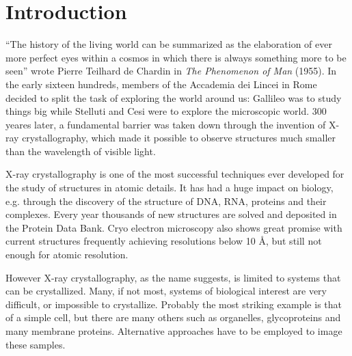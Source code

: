 \chapter{Introduction}\label{introduction}\noindent

``The history of the living world can be summarized as the elaboration of ever
more perfect eyes within a cosmos in which there is always something more to be
seen'' wrote Pierre Teilhard de Chardin in {\em The Phenomenon of Man} (1955). In the
early sixteen hundreds, members of the Accademia dei Lincei in Rome decided to
split the task of exploring the world around us: Gallileo was to study things
big while Stelluti and Cesi were to explore the microscopic world. 300 yeares
later, a fundamental barrier was taken down through the invention of X-ray
crystallography, which made it possible to observe structures much smaller than
the wavelength of visible light.

X-ray crystallography is one of the most successful techniques ever developed
for the study of structures in atomic details. It has had a huge impact on
biology, e.g. through the discovery of the structure of DNA, RNA, proteins
and their complexes. Every year thousands of new structures are solved and
deposited in the Protein Data Bank. Cryo electron microscopy also shows great
promise with current structures frequently achieving resolutions below 10 \AA,
but still not enough for atomic resolution. 



However X-ray crystallography, as the name suggests, is limited to systems that
can be crystallized. Many, if not most, systems of biological interest are very
difficult, or impossible to crystallize. Probably the most striking example is
that of a simple cell, but there are many others such as organelles, glycoproteins and many
membrane proteins. Alternative approaches have to be employed to image these
samples.

